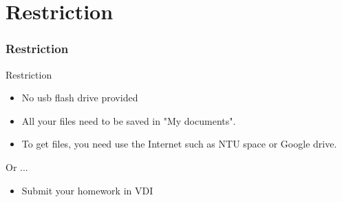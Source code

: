 \documentclass [12pt] {beamer}
\begin{document}
    \section {Restriction}
    \begin {frame}
        \frametitle {Restriction}
        \begin {block} {Restriction}
        \begin {itemize}
            \item No usb flash drive provided
            \item All your files need to be saved in "My documents".
            \item To get files, you need use the \alert{Internet} such as NTU space or Google drive.
        \end {itemize}
        \end {block}
        \begin {block} {Or ...}
        \begin {itemize}
            \item Submit your homework in VDI
        \end {itemize}
        \end {block}
    \end {frame}
\end{document}
